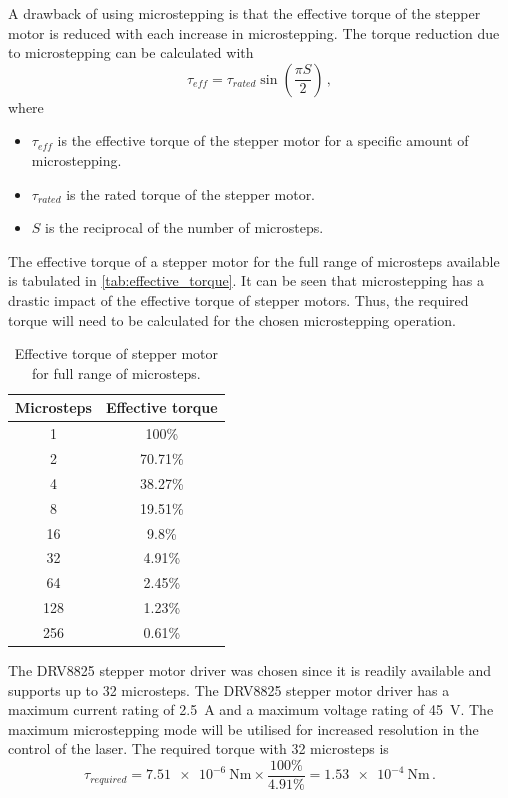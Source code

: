 A drawback of using microstepping is that the effective torque of the stepper motor is reduced with each increase in microstepping. The torque reduction due to microstepping can be calculated with
\begin{equation}
    \tau_{eff} = \tau_{rated} \sin \left(\frac{\pi S}{2}\right)\,,
\end{equation}
where
\begin{itemize}
    \item $\tau_{eff}$ is the effective torque of the stepper motor for a specific amount of microstepping.
    \item $\tau_{rated}$ is the rated torque of the stepper motor.
    \item $S$ is the reciprocal of the number of microsteps.
\end{itemize}

The effective torque of a stepper motor for the full range of microsteps available is tabulated in \autoref{tab:effective_torque}. It can be seen that microstepping has a drastic impact of the effective torque of stepper motors. Thus, the required torque will need to be calculated for the chosen microstepping operation.
\begin{table}[h]
    \centering
    \begin{tabular}{|c|c|}
        \hline
        Microsteps & Effective torque \\
        \hline
        1          & 100\%            \\
        2          & 70.71\%          \\
        4          & 38.27\%          \\
        8          & 19.51\%          \\
        16         & 9.8\%            \\
        32         & 4.91\%           \\
        64         & 2.45\%           \\
        128        & 1.23\%           \\
        256        & 0.61\%           \\
        \hline
    \end{tabular}
    \caption{Effective torque of stepper motor for full range of microsteps.}
    \label{tab:effective_torque}
\end{table}

The DRV8825 stepper motor driver was chosen since it is readily available and supports up to 32 microsteps. The DRV8825 stepper motor driver has a maximum current rating of 2.5~A and a maximum voltage rating of 45~V. The maximum microstepping mode will be utilised for increased resolution in the control of the laser. The required torque with 32 microsteps is
\begin{equation}
    \tau_{required} = \SI{7.51e-6}{\newton\meter} \times \frac{100\%}{4.91\%} = \SI{1.53e-4}{\newton\meter}\,.
\end{equation}


